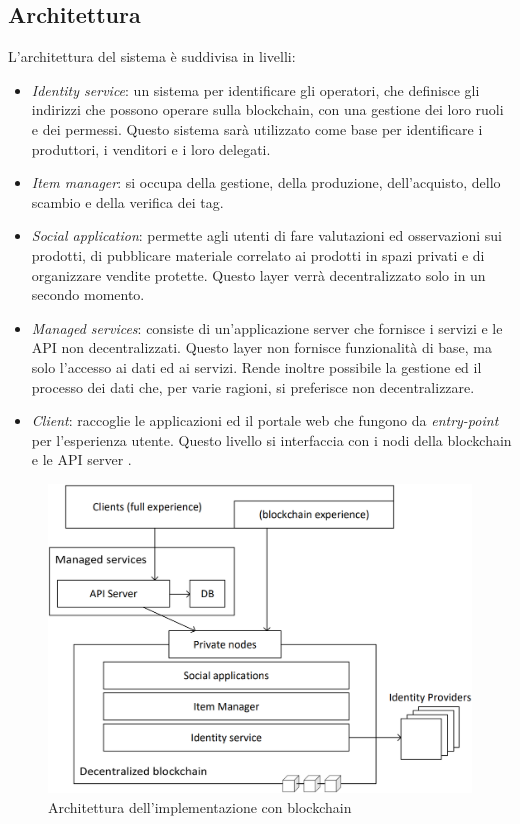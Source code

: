\subsection{Architettura}
L'architettura del sistema è suddivisa in livelli:
\begin{itemize}
    \item \emph{Identity service}: un sistema per identificare gli operatori, che definisce gli indirizzi che possono operare sulla blockchain, con una gestione dei loro ruoli e dei permessi. Questo sistema sarà utilizzato come base per identificare i produttori, i venditori e i loro delegati.
    \item \emph{Item manager}: si occupa della gestione, della produzione, dell'acquisto, dello scambio e della verifica dei tag.
    \item \emph{Social application}: permette agli utenti di fare valutazioni ed osservazioni sui prodotti, di pubblicare materiale correlato ai prodotti in spazi privati e di organizzare vendite protette. Questo layer verrà decentralizzato solo in un secondo momento.
    \item \emph{Managed services}: consiste di un'applicazione server che fornisce i servizi e le API non decentralizzati. Questo layer non fornisce funzionalità di base, ma solo l'accesso ai dati ed ai servizi. Rende inoltre possibile la gestione ed il processo dei dati che, per varie ragioni, si preferisce non decentralizzare.
    \item \emph{Client}: raccoglie le applicazioni ed il portale web che fungono da \emph{entry-point} per l'esperienza utente. Questo livello si interfaccia con i nodi della blockchain e le API server \cite{bCerty-whitepaper}.
\end{itemize}

\begin{figure}[h!]
    \centering
    \includegraphics[scale=0.25]{img/architettura.png}
    \caption{Architettura dell'implementazione con blockchain}
    \label{fig:architettura}
\end{figure}

